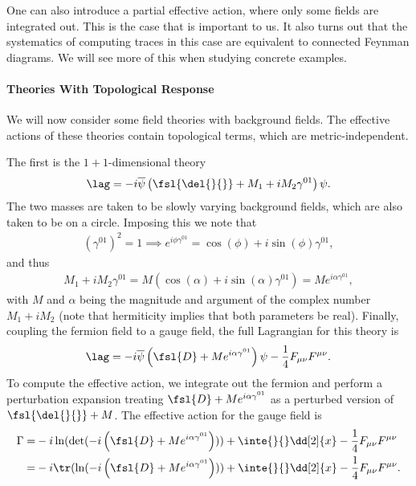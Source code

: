 One can also introduce a partial effective action, where only some fields are integrated out. This is the case that is important to us. It also turns out that the systematics of computing traces in this case are equivalent to connected Feynman diagrams. We will see more of this when studying concrete examples.

\paragraph{Theories With Topological Response}
We will now consider some field theories with background fields. The effective actions of these theories contain topological terms, which are metric-independent. 

The first is the $1 + 1$-dimensional theory
\begin{align*}
	\lag = -i\overline{\psi}\left(\fsl{\del{}{}} + M_{1} + iM_{2}\gamma^{01}\right)\psi.
\end{align*}
The two masses are taken to be slowly varying background fields, which are also taken to be on a circle. Imposing this we note that
\begin{align*}
	(\gamma^{01})^{2} = 1 \implies e^{i\phi\gamma^{01}} = \cos(\phi) + i\sin(\phi)\gamma^{01},
\end{align*}
and thus
\begin{align*}
	M_{1} + iM_{2}\gamma^{01} = M\left(\cos(\alpha) + i\sin(\alpha)\gamma^{01}\right) = Me^{i\alpha\gamma^{01}},
\end{align*}
with $M$ and $\alpha$ being the magnitude and argument of the complex number $M_{1} + iM_{2}$ (note that hermiticity implies that both parameters be real). Finally, coupling the fermion field to a gauge field, the full Lagrangian for this theory is
\begin{align*}
	\lag = -i\overline{\psi}\left(\fsl{D} + Me^{i\alpha\gamma^{01}}\right)\psi - \frac{1}{4}F_{\mu\nu}F^{\mu\nu}.
\end{align*}
To compute the effective action, we integrate out the fermion and perform a perturbation expansion treating $\fsl{D} + Me^{i\alpha\gamma^{01}}$ as a perturbed version of $\fsl{\del{}{}} + M$. The effective action for the gauge field is
\begin{align*}
	\Gamma =& -i\ln(\det(-i\left(\fsl{D} + Me^{i\alpha\gamma^{01}}\right))) + \inte{}{}\dd[2]{x}-\frac{1}{4}F_{\mu\nu}F^{\mu\nu} \\
	       =& -i\tr(\ln(-i\left(\fsl{D} + Me^{i\alpha\gamma^{01}}\right))) + \inte{}{}\dd[2]{x}-\frac{1}{4}F_{\mu\nu}F^{\mu\nu}.
\end{align*}
